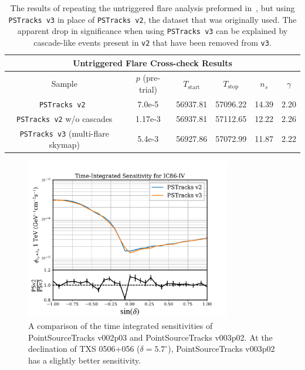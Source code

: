 \begin{table}[h]
\centering
\begin{tabular}{cccccc}
\multicolumn{6}{c}{Untriggered Flare Cross-check Results} \\[0.1cm]
\hline
\hline
Sample & $p$ (pre-trial) & $T_\text{start}$ & $T_\text{stop}$ & $n_s$ & $\gamma$ \\ 
\hline
\texttt{PSTracks v2}~\cite{TXS_Archival} & 7.0e-5 & 56937.81 & 57096.22 & 14.39 & 2.20  \\
\texttt{PSTracks v2} w/o cascades & 1.17e-3 & 56937.81 & 57112.65 & 12.22 & 2.26 \\
\texttt{PSTracks v3} (multi-flare skymap) & 5.4e-3 & 56927.86 & 57072.99 & 11.87 & 2.22\\
\hline
\hline
\end{tabular}
\caption[]{The results of repeating the untriggered flare analysis preformed in~\cite{TXS_Archival}, but using {\tt PSTracks v3} in place of {\tt PSTracks v2}, the dataset that was originally used. The apparent drop in significance when using {\tt PSTracks v3} can be explained by cascade-like events present in {\tt v2} that have been removed from {\tt v3}.}\label{tab:TXSCrossChecks}
\end{table}


\begin{figure}[h]
\centering
\includegraphics[width=0.8\textwidth]{figs/v2v3_senscompare.pdf}
\caption{A comparison of the time integrated sensitivities of PointSourceTracks v002p03 and PointSourceTracks v003p02. At the declination of TXS 0506+056 ($\delta=5.7^{\circ}$), PointSourceTracks v003p02 has a slightly better sensitivity. }
\label{fig:fcurve_txs}
\end{figure}

